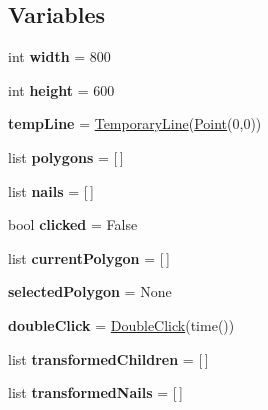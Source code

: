 \subsection*{Variables}
\begin{DoxyCompactItemize}
\item 
\mbox{\label{namespacemain_a45532432f3eaf99712b1c921e1e7fa96}} 
int {\bfseries width} = 800
\item 
\mbox{\label{namespacemain_a94be9c33154f8abfadfc37bd3f07d910}} 
int {\bfseries height} = 600
\item 
\mbox{\label{namespacemain_ad6ed2ca0de7745c0538b39f53443f6fa}} 
{\bfseries temp\+Line} = \hyperlink{classadditional__classes_1_1TemporaryLine}{Temporary\+Line}(\hyperlink{classgeometry_1_1Point}{Point}(0,0))
\item 
\mbox{\label{namespacemain_ac179743eef5260b1b36e9867eeaa459e}} 
list {\bfseries polygons} = \mbox{[}$\,$\mbox{]}
\item 
\mbox{\label{namespacemain_a184193594cc4348fd4f60c39b6a01fcc}} 
list {\bfseries nails} = \mbox{[}$\,$\mbox{]}
\item 
\mbox{\label{namespacemain_adf37c1088b5a3b0bb91496b491b8a83c}} 
bool {\bfseries clicked} = False
\item 
\mbox{\label{namespacemain_a6e44d6dc26cd21cbe7c927f09b7d4d21}} 
list {\bfseries current\+Polygon} = \mbox{[}$\,$\mbox{]}
\item 
\mbox{\label{namespacemain_a3642375aa9ef1e3fd8ef4a2cd4c09e8e}} 
{\bfseries selected\+Polygon} = None
\item 
\mbox{\label{namespacemain_ad8ecf5db937f2635bf56dcdf3385e8e5}} 
{\bfseries double\+Click} = \hyperlink{classadditional__classes_1_1DoubleClick}{Double\+Click}(time())
\item 
\mbox{\label{namespacemain_a6e5230fd1a746cd13a3cf00f6b50db5a}} 
list {\bfseries transformed\+Children} = \mbox{[}$\,$\mbox{]}
\item 
\mbox{\label{namespacemain_aef6d673950d75316b45b1d74dc79db40}} 
list {\bfseries transformed\+Nails} = \mbox{[}$\,$\mbox{]}
\end{DoxyCompactItemize}


